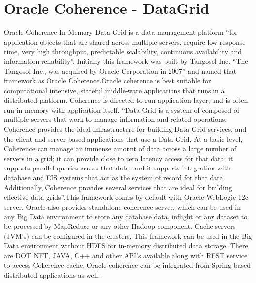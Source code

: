 \section{Oracle Coherence - DataGrid}

Oracle Coherence In-Memory Data Grid is a data management platform “for application objects that are shared across multiple servers, require low response time, very high throughput, predictable scalability, continuous availability and information reliability”\cite{hid-sp18-514-OracleCoherence}. 
Initially this framework was built by Tangosol Inc. “The Tangosol Inc., was acquired by Oracle Corporation in 2007”\cite{hid-sp18-514-coherencewiki} and named that framework as Oracle Coherence.Oracle coherence is best suitable for computational intensive, stateful middle-ware applications that runs in a distributed platform. Coherence is directed to run application layer, and is often run in-memory with application itself. “Data Grid is a system of composed of multiple servers that work to manage information and related operations. Coherence provides the ideal infrastructure for building Data Grid services, and the client and server-based applications that use a Data Grid. At a basic level, Coherence can manage an immense amount of data across a large number of servers in a grid; it can provide close to zero latency access for that data; it supports parallel queries across that data; and it supports integration with database and EIS systems that act as the system of record for that data. Additionally, Coherence provides several services that are ideal for building effective data grids”\cite{hid-sp18-514-OracleCoherence}.This framework comes by default with Oracle WebLogic 12c server. Oracle also provides standalone coherence server, which can be used in any Big Data environment to store any database data, inflight or any dataset to be processed by MapReduce or any other Hadoop component. Cache servers (JVM’s) can be configured in the clusters. This framework can be used in the Big Data environment without HDFS for in-memory distributed data storage. There are DOT NET, JAVA, C++ and other API’s available along with REST service to access Coherence cache\cite{hid-sp18-514-OracleCoherence}. Oracle coherence can be integrated from Spring based distributed applications as well\cite{hid-sp18-514-CoherenceSpringInt}.

